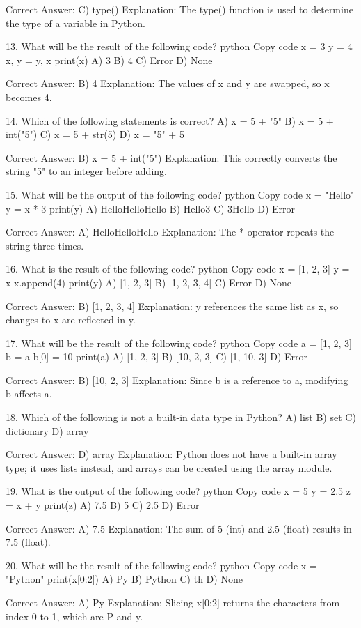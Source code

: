 Correct Answer: C) type()
Explanation: The type() function is used to determine the type of a variable in Python.

13. What will be the result of the following code?
python
Copy code
x = 3
y = 4
x, y = y, x
print(x)
A) 3
B) 4
C) Error
D) None

Correct Answer: B) 4
Explanation: The values of x and y are swapped, so x becomes 4.

14. Which of the following statements is correct?
A) x = 5 + "5"
B) x = 5 + int("5")
C) x = 5 + str(5)
D) x = "5" + 5

Correct Answer: B) x = 5 + int("5")
Explanation: This correctly converts the string "5" to an integer before adding.

15. What will be the output of the following code?
python
Copy code
x = "Hello"
y = x * 3
print(y)
A) HelloHelloHello
B) Hello3
C) 3Hello
D) Error

Correct Answer: A) HelloHelloHello
Explanation: The * operator repeats the string three times.

16. What is the result of the following code?
python
Copy code
x = [1, 2, 3]
y = x
x.append(4)
print(y)
A) [1, 2, 3]
B) [1, 2, 3, 4]
C) Error
D) None

Correct Answer: B) [1, 2, 3, 4]
Explanation: y references the same list as x, so changes to x are reflected in y.

17. What will be the result of the following code?
python
Copy code
a = [1, 2, 3]
b = a
b[0] = 10
print(a)
A) [1, 2, 3]
B) [10, 2, 3]
C) [1, 10, 3]
D) Error

Correct Answer: B) [10, 2, 3]
Explanation: Since b is a reference to a, modifying b affects a.

18. Which of the following is not a built-in data type in Python?
A) list
B) set
C) dictionary
D) array

Correct Answer: D) array
Explanation: Python does not have a built-in array type; it uses lists instead, and arrays can be created using the array module.

19. What is the output of the following code?
python
Copy code
x = 5
y = 2.5
z = x + y
print(z)
A) 7.5
B) 5
C) 2.5
D) Error

Correct Answer: A) 7.5
Explanation: The sum of 5 (int) and 2.5 (float) results in 7.5 (float).

20. What will be the result of the following code?
python
Copy code
x = "Python"
print(x[0:2])
A) Py
B) Python
C) th
D) None

Correct Answer: A) Py
Explanation: Slicing x[0:2] returns the characters from index 0 to 1, which are P and y.

